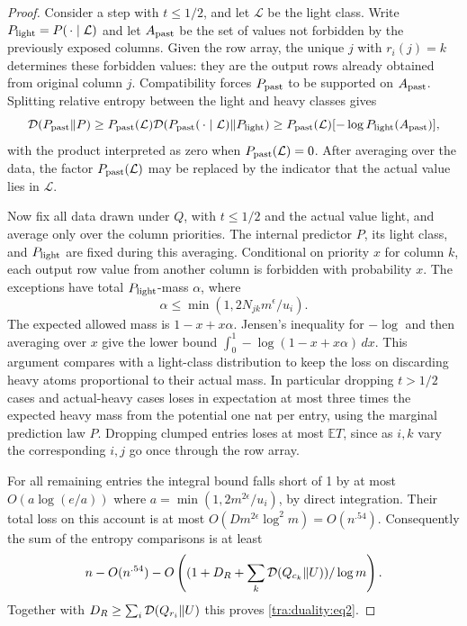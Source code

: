 \begin{proof}
Consider a step with $t\le1/2$, and let $\mathcal L$ be the light class. Write
$P_{\rm light}=P(\,\cdot\mid\mathcal L)$ and let $A_{\rm past}$ be the set of
values not forbidden by the previously exposed columns. Given the row
array, the unique $j$ with $r_i(j)=k$ determines these forbidden values:
they are the output rows already obtained from original column $j$.
Compatibility forces $P_{\rm past}$ to be supported on $A_{\rm past}$.
Splitting relative entropy between the light and heavy classes gives
\[
 \mathcal D(P_{\rm past}\|P)
 \ge P_{\rm past}(\mathcal L)
       \mathcal D(P_{\rm past}(\,\cdot\mid\mathcal L)\|P_{\rm light})
 \ge P_{\rm past}(\mathcal L)[-\log P_{\rm light}(A_{\rm past})],
\]
with the product interpreted as zero when $P_{\rm past}(\mathcal L)=0$.
After averaging over the data, the factor $P_{\rm past}(\mathcal L)$ may be
replaced by the indicator that the actual value lies in  $\mathcal L$.

Now fix all data drawn under $Q$, with $t\le1/2$ and the actual value
light, and average only over the column priorities. The internal
predictor $P$, its light class, and $P_{\rm light}$ are fixed during
this averaging. Conditional on priority $x$ for column $k$, each output
row value from another column is forbidden with probability $x$.
The exceptions have total $P_{\rm light}$-mass $\alpha$, where
\[
 \alpha\le\min(1,2N_{jk}m^\epsilon/u_i).
\]
The expected allowed mass is $1-x+x\alpha$. Jensen's inequality for
$-\log$ and then averaging over $x$ give the lower bound
$\int_0^1-\log(1-x+x\alpha)\,dx$. This argument compares with a light-class distribution to keep the loss on discarding heavy atoms proportional to their actual mass. In particular dropping \(t>1/2\) cases and actual-heavy cases loses in expectation at most three times the expected heavy mass from the potential one nat per entry, using the marginal prediction law \(P\). Dropping clumped entries loses at most \(\mathbb E T\), since as \(i,k\) vary the corresponding \(i,j\) go once through the row array.

For all remaining entries the integral bound falls short of 1 by at most \(O(a\log(e/a))\) where \(a=\min(1,2m^{2\epsilon}/u_i)\), by direct integration. Their total loss on this account is at most \(O(D m^{2\epsilon}\log^2 m)=O(n^{.54})\). Consequently the sum of the entropy comparisons is at least
\[
       n-O(n^{.54})
       -O\left((1+D_R+\sum_k{\cal D}(Q_{c_k}\|U))/\log m\right).
\]
Together with \(D_R\ge\sum_i{\cal D}(Q_{r_i}\|U)\) this proves \eqref{tra:duality:eq2}.
\end{proof}
